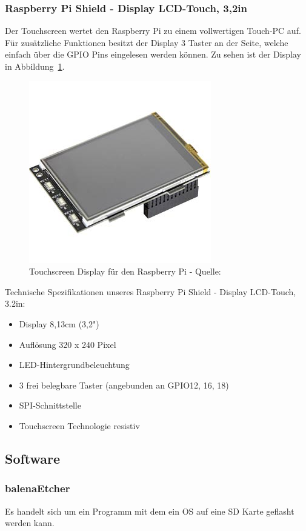\documentclass[a4paper,11pt,singlespacing]{article}
\begin{document}
			\subsubsection{Raspberry Pi Shield - Display LCD-Touch, 3,2in}
				Der Touchscreen wertet den Raspberry Pi zu einem vollwertigen Touch-PC auf. Für zusätzliche Funktionen besitzt der Display 3 Taster an der Seite, welche einfach über die GPIO Pins eingelesen werden können. Zu sehen ist der Display in Abbildung~\ref{touchdisplay}. 
				\begin{figure}[H]
					\centering
					\includegraphics[scale=0.5]{touch_display}
					\caption{Touchscreen Display für den Raspberry Pi - Quelle: \cite{Picture_touchdisplay}}
					\label{touchdisplay}
				\end{figure}
				Technische Spezifikationen unseres Raspberry Pi Shield - Display LCD-Touch, 3.2in:
				\begin{itemize}
					\item Display 8,13cm (3,2")
					\item Auflösung 320 x 240 Pixel
					\item LED-Hintergrundbeleuchtung
					\item 3 frei belegbare Taster (angebunden an GPIO12, 16, 18)
					\item SPI-Schnittstelle
					\item Touchscreen Technologie resistiv
				\end{itemize}
    			
    	\subsection{Software}
    		\subsubsection{balenaEtcher}
    			Es handelt sich um ein Programm mit dem ein OS auf eine SD Karte geflasht werden kann.
\end{document}
